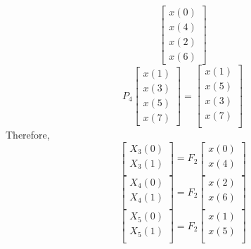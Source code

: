 \documentclass[journal,12pt,twocolumn]{IEEEtran}
\renewcommand\thesection{\arabic{section}}
\begin{document}
\begin{enumerate}[label=\thesection.\arabic*]
\begin{equation}
\begin{bmatrix}
x(0) \\ 
x(4) \\ 
x(2) \\
x(6)
\end{bmatrix}
\end{equation}
\begin{equation}
P_{4}
\begin{bmatrix}
x(1) \\ 
x(3) \\ 
x(5) \\
x(7)
\end{bmatrix}
 = 
\begin{bmatrix}
x(1) \\ 
x(5) \\ 
x(3) \\ 
x(7) \\
\end{bmatrix}
\end{equation}
Therefore,
\begin{equation}
\begin{bmatrix}
X_{3}(0) \\ 
X_{3}(1)\\ 
\end{bmatrix}
= F_{2}
\begin{bmatrix}
x(0) \\ 
x(4) \\ 
\end{bmatrix}
\end{equation}
\begin{equation}
\begin{bmatrix}
X_{4}(0) \\ 
X_{4}(1)\\ 
\end{bmatrix}
= F_{2}
\begin{bmatrix}
x(2) \\ 
x(6) \\ 
\end{bmatrix}
\end{equation}
\begin{equation}
\begin{bmatrix}
X_{5}(0) \\ 
X_{5}(1)\\ 
\end{bmatrix}
= F_{2}
\begin{bmatrix}
x(1) \\ 
x(5) \\ 
\end{bmatrix}
\end{equation}

\end{enumerate}
\end{document}
